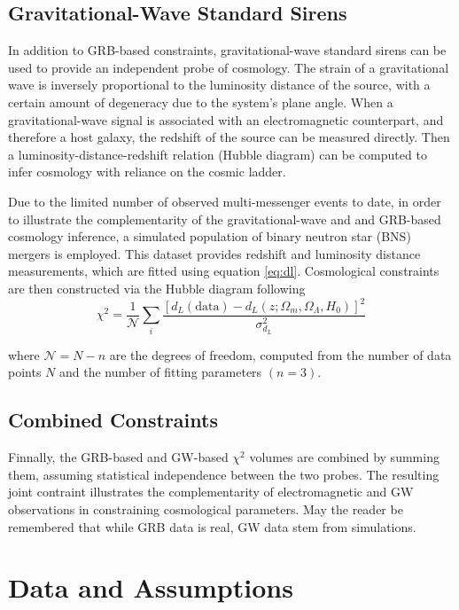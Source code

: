 \documentclass[
    aps,
    prd,
    twocolumn,
    nofootinbib,
    floatfix,
    superscriptaddress
]{revtex4-2}
\begin{document}
\subsection{Gravitational-Wave Standard Sirens}

In addition to GRB-based constraints, gravitational-wave standard sirens can be used to provide an independent probe of cosmology. The strain of a gravitational wave is inversely proportional to the luminosity distance of the source, with a certain amount of degeneracy due to the system's plane angle. When a gravitational-wave signal is associated with an electromagnetic counterpart, and therefore a host galaxy, the redshift of the source can be measured directly. Then a luminosity-distance-redshift relation (Hubble diagram) can be computed to infer cosmology with reliance on the cosmic ladder.

Due to the limited number of observed multi-messenger events to date, in order to illustrate the complementarity of the gravitational-wave and and GRB-based cosmology inference, a simulated population of binary neutron star (BNS) mergers is employed. This dataset provides redshift and luminosity distance measurements, which are fitted using equation \ref{eq:dl}. Cosmological constraints are then constructed via the Hubble diagram following
$$
\chi^2 = \frac{1}{\mathcal{N}} \sum_i \frac{\left[d_L(\text{data}) - d_L (z; \Omega_m, \Omega_\Lambda, H_0)\right]^2}{\sigma_{d_L}^2}
$$

where $\mathcal{N} = N-n$ are the degrees of freedom, computed from the number of data points $N$ and the number of fitting parameters $(n=3)$.

\subsection{Combined Constraints}

Finnally, the GRB-based and GW-based $\chi^2$ volumes are combined by summing them, assuming statistical independence between the two probes. The resulting joint contraint illustrates the complementarity of electromagnetic and GW observations in constraining cosmological parameters. May the reader be remembered that while GRB data is real, GW data stem from simulations.

\section{Data and Assumptions}
\end{document}
